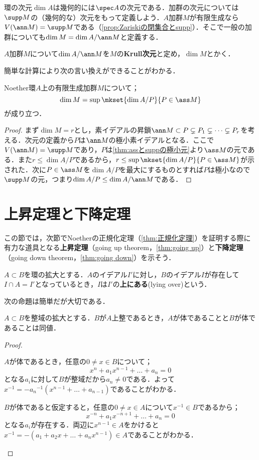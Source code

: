 環の次元$\dim A$は幾何的には$\spec A$の次元である．加群の次元については$\supp M$の（幾何的な）次元をもって定義しよう．$A$加群$M$が有限生成なら$V(\ann M)=\supp M$である（\ref{prop:Zariskiの閉集合とsupp}）．そこで一般の加群についても$\dim M=\dim A/\ann M$と定義する．

\begin{defi}[加群のKrull次元]
	$A$加群$M$について$\dim A/\ann M$を$M$の\textbf{Krull次元}と定め，$\dim M$とかく．
\end{defi}

簡単な計算により次の言い換えができることがわかる．

\begin{prop}
	Noether環$A$上の有限生成加群$M$について；
	\[\dim M=\sup\mkset{\dim A/P}{P\in\ass M}\]
	が成り立つ．
\end{prop}
\begin{proof}
	まず$\dim M=r$とし，素イデアルの昇鎖$\ann M \subset P\subsetneq P_1\subsetneq\dots\subsetneq P_r$を考える．次元の定義から$P$は$\ann M$の極小素イデアルとなる．ここで$V(\ann M)=\supp M$であり，$P$は\ref{thm:assとsuppの極小元}より$\ass M$の元である．また$r\leq \dim A/P$であるから，$r\leq\sup\mkset{\dim A/P}{P\in\ass M}$が示された．次に$P\in\ass M$を$\dim A/P$を最大にするものとすれば$P$は極小なので$\supp M$の元，つまり$\dim A/P\leq\dim A/\ann M$である．
\end{proof}

\section{上昇定理と下降定理}
この節では，次節でNoetherの正規化定理（\ref{thm:正規化定理}）を証明する際に有力な道具となる\textbf{上昇定理}（going up theorem，\ref{thm:going up}）と\textbf{下降定理}（going down theorem，\ref{thm:going down}）を示そう．

\begin{defi}
	$A\subset B$を環の拡大とする．$A$のイデアル$I'$に対し，$B$のイデアル$I$が存在して$I\cap A=I'$となっているとき，$I$は$I'$の\textbf{上にある}(lying over)という．
\end{defi}

次の命題は簡単だが大切である．
\begin{prop}\label{prop:整域の整拡大と体}
	$A\subset B$を整域の拡大とする．$B$が$A$上整であるとき，$A$が体であることと$B$が体であることは同値．
\end{prop}

\begin{proof}
	\begin{eqv}
		\item $A$が体であるとき，任意の$0\neq x\in B$について；
		\[x^n+a_1x^{n-1}+\dots+a_n=0\]
		となる$a_i$に対して$B$が整域だから$a_n\neq0$である．よって$x^{-1}=-{a_n}^{-1}(x^{n-1}+\dots+a_{n-1})$であることがわかる．
		
		\item $B$が体であると仮定すると，任意の$0\neq x\in A$について$x^{-1}\in B$であるから；
		\[x^{-n}+a_1x^{-n+1}+\dots+a_n=0\]
		となる$a_i$が存在する．両辺に$x^{n-1}\in A$をかけると$x^{-1}=-(a_1+a_2x+\dots+a_nx^{n-1})\in A$であることがわかる．
	\end{eqv}
\end{proof}

